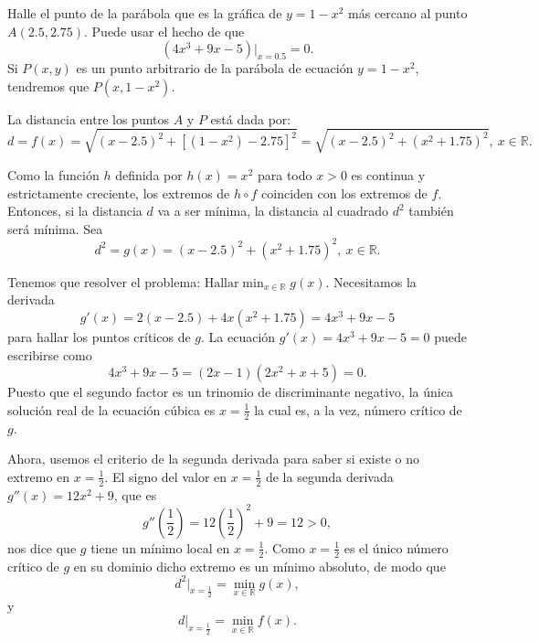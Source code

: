 \begin{exemplo}[Solución]{%
Halle el punto de la parábola que es la gráfica de $y = 1-x^2$ más cercano al punto
$A(2.5,2.75)$. Puede usar el hecho de que
\begin{equation*}
    (4x^3+9x-5)\Big |_{x=0.5}=0.
\end{equation*}
}%
Si $P(x,y)$ es un punto arbitrario de la parábola de ecuación $y = 1-x^2$, tendremos que
$P(x,1-x^2)$.

La distancia entre los puntos $A$ y $P$ está dada por:
\begin{equation*}
    d = f(x) = \sqrt{(x-2.5)^2+[  (1-x^2)-2.75 ]^2}= \sqrt{(x-2.5)^2+ (x^2+1.75)^2}, \ x\in \mathbb{R}.
\end{equation*}

Como la función $h$ definida por $h(x) = x^2$ para todo $x > 0$ es continua y estrictamente
creciente, los extremos de $h\circ f$ coinciden con los extremos de $f$. Entonces, si la distancia
$d$ va a ser mínima, la distancia al cuadrado $d^2$ también será mínima. Sea
\begin{equation*}
    d^2 = g(x) = (x-2.5)^2+ (x^2+1.75)^2, \ x\in \mathbb{R}.
\end{equation*}

Tenemos que resolver el problema:
$\displaystyle
    \text{Hallar} \min_{x\in \mathbb{R}}g(x).
$
Necesitamos la derivada
\begin{equation*}
    g'(x) = 2(x-2.5)+ 4x(x^2+1.75)= 4x^3+9x-5
\end{equation*}
para hallar los puntos críticos de $g$. La ecuación $g'(x)=4x^3+9x-5=0$ puede escribirse como
\begin{equation*}
    4x^3+9x-5=(2x-1)(2x^2+x+5)= 0.
\end{equation*}
Puesto que el segundo factor es un trinomio de discriminante negativo, la única solución real de la
ecuación cúbica es $x = \frac{1}{2}$ la cual es, a la vez, número crítico de $g$.

Ahora, usemos el criterio de la segunda derivada para saber si existe o no extremo en $x =
\frac{1}{2}$. El signo del valor en $x = \frac{1}{2}$ de la segunda derivada  $g''(x)= 12x^2+9$,
que es
\begin{equation*}
  g''\left( \frac{1}{2}\right)= 12\left(\frac{1}{2}\right)^2+9 = 12>0,
\end{equation*}
nos dice que $g$ tiene un mínimo local en $x = \frac{1}{2}$. Como $x = \frac{1}{2}$ es el único
número crítico de $g$ en su dominio dicho extremo es un mínimo absoluto, de modo que
\begin{equation*}
    d^2\Big|_{x=\frac{1}{2}} = \min_{x\in \mathbb{R}}g(x),
\end{equation*}
y
\begin{equation*}
    d\Big|_{x=\frac{1}{2}} = \min_{x\in \mathbb{R}}f(x).
\end{equation*}


\end{exemplo}
